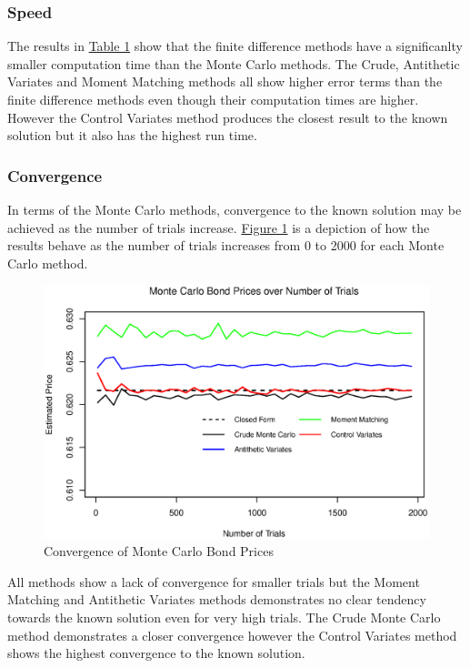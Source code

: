 \documentclass[12pt,a4paper]{article}
\begin{document}
\subsubsection{Speed}
The results in \hyperref[tab: Table1]{Table 1} show that the finite difference methods have a significanlty smaller computation time than the Monte Carlo methods. The Crude, Antithetic Variates and Moment Matching methods all show higher error terms than the finite difference methods even though their computation times are higher. However the Control Variates method produces the closest result to the known solution but it also has the highest run time. 



\subsubsection{Convergence}

In terms of the Monte Carlo methods, convergence to the known solution may be achieved as the number of trials increase. \hyperref[fig:MC Conv]{Figure 1} is a depiction of how the results behave as the number of trials increases from 0 to 2000 for each Monte Carlo method. 
\begin{figure}[H]	
	\label{fig:MC Conv}
	\begin{center}
		\includegraphics[trim={0 0.5cm 0 0},clip, width = 14cm]{MC_Conv.eps}
		\caption{Convergence of Monte Carlo Bond Prices}
	\end{center}
\end{figure}

All methods show a lack of convergence for smaller trials but the Moment Matching and Antithetic Variates methods demonstrates no clear tendency towards the known solution even for very high trials. The Crude Monte Carlo method demonstrates a closer convergence however the Control Variates method shows the highest convergence to the known solution.
\end{document}
